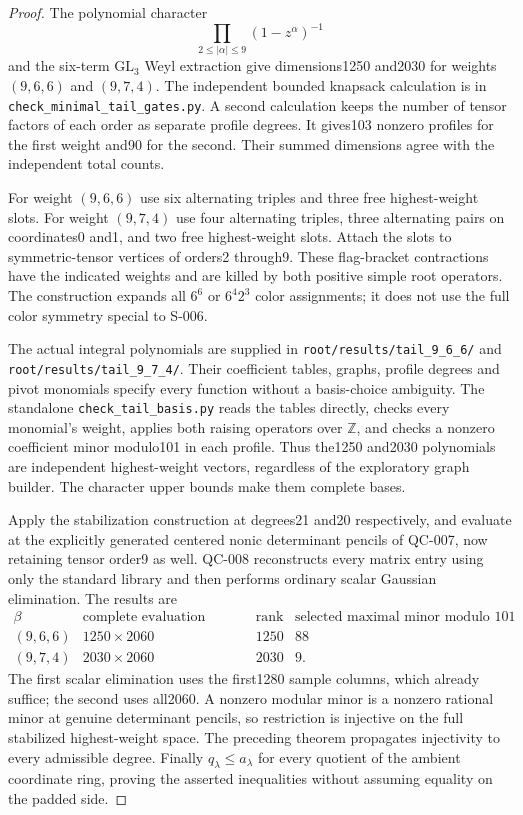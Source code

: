 \begin{proof}
The polynomial character
\[
 \prod_{2\le|\alpha|\le9}(1-z^\alpha)^{-1}
\]
and the six-term $\mathrm{GL}_3$ Weyl extraction give dimensions1250
and2030 for weights $(9,6,6)$ and $(9,7,4)$. The independent bounded
knapsack calculation is in \texttt{check\_minimal\_tail\_gates.py}.
A second calculation keeps the number of tensor factors of each order
as separate profile degrees. It gives103 nonzero profiles for the
first weight and90 for the second. Their summed dimensions agree
with the independent total counts.

For weight $(9,6,6)$ use six alternating triples and three free
highest-weight slots. For weight $(9,7,4)$ use four alternating triples,
three alternating pairs on coordinates0 and1, and two free
highest-weight slots. Attach the slots to symmetric-tensor vertices
of orders2 through9. These flag-bracket contractions have the indicated
weights and are killed by both positive simple root operators.
The construction expands all $6^6$ or $6^4 2^3$ color assignments;
it does not use the full color symmetry special to S-006.

The actual integral polynomials are supplied in
\texttt{root/results/tail\_9\_6\_6/} and
\texttt{root/results/tail\_9\_7\_4/}. Their coefficient tables,
graphs, profile degrees and pivot monomials specify every function
without a basis-choice ambiguity. The standalone
\texttt{check\_tail\_basis.py} reads the tables directly, checks
every monomial's weight, applies both raising operators over
$\mathbb Z$, and checks a nonzero coefficient minor modulo101 in
each profile. Thus the1250 and2030 polynomials are independent
highest-weight vectors, regardless of the exploratory graph builder.
The character upper bounds make them complete bases.

Apply the stabilization construction at degrees21 and20 respectively,
and evaluate at the explicitly generated centered nonic determinant
pencils of QC-007, now retaining tensor order9 as well. QC-008
reconstructs every matrix entry using only the standard library and
then performs ordinary scalar Gaussian elimination. The results are
\[
\begin{array}{c|c|r|r}
\beta&\text{complete evaluation matrix}&\text{rank}&
      \text{selected maximal minor modulo }101\\\hline
(9,6,6)&1250\times2060&1250&88\\
(9,7,4)&2030\times2060&2030&9.
\end{array}
\]
The first scalar elimination uses the first1280 sample columns,
which already suffice; the second uses all2060. A nonzero modular
minor is a nonzero rational minor at genuine determinant pencils,
so restriction is injective on the full stabilized highest-weight
space. The preceding theorem propagates injectivity to every
admissible degree. Finally $q_\lambda\le a_\lambda$ for every
quotient of the ambient coordinate ring, proving the asserted
inequalities without assuming equality on the padded side.
\end{proof}

